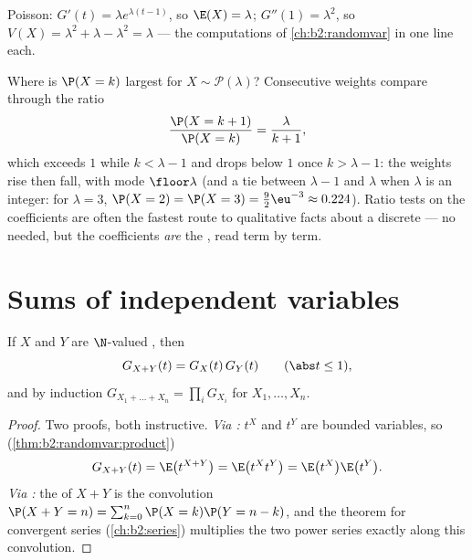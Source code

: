 \begin{example}
Poisson: $G'(t) = \lambda e^{\lambda(t-1)}$, so $\E(X) = \lambda$;
$G''(1) = \lambda^2$, so $V(X) = \lambda^2 + \lambda - \lambda^2 =
\lambda$ --- the computations of \cref{ch:b2:randomvar} in one
line each.
\end{example}

\begin{example}
\label{ex:b2:genfun:poissonmode}
Where is $\P(X = k)$ largest for $X \sim \mathcal
P(\lambda)$? Consecutive weights compare through the ratio
\[
\frac{\P(X = k+1)}{\P(X = k)} = \frac{\lambda}{k + 1} ,
\]
which exceeds $1$ while $k < \lambda - 1$ and drops below
$1$ once $k > \lambda - 1$: the weights rise then fall, with
mode $\floor\lambda$ (and a tie between $\lambda - 1$ and
$\lambda$ when $\lambda$ is an integer: for $\lambda = 3$,
$\P(X = 2) = \P(X = 3) = \frac92\eu^{-3} \approx 0.224$).
Ratio tests on the coefficients are often the fastest route
to qualitative facts about a discrete  --- no  needed, but the coefficients \emph{are} the
, read term by term.
\end{example}

\section{Sums of independent variables}

\begin{theorem}[Multiplicativity]\label{thm:b2:genfun:product}
If $X$ and $Y$ are  $\N$-valued , then
\[
G_{X + Y}(t) = G_X(t)\,G_Y(t)
\qquad (\abs t \leq 1),
\]
and by induction $G_{X_1 + \dots + X_n} = \prod_i G_{X_i}$ for
 $X_1, \dots, X_n$.
\end{theorem}

\begin{proof}
Two proofs, both instructive. \emph{Via :} $t^X$ and
$t^Y$ are  bounded variables, so
(\cref{thm:b2:randomvar:product})
\[
G_{X+Y}(t) = \E\bigl(t^{X+Y}\bigr)
= \E\bigl(t^X t^Y\bigr)
= \E\bigl(t^X\bigr)\E\bigl(t^Y\bigr) .
\]
\emph{Via :} the  of $X + Y$ is the convolution
$\P(X + Y = n) = \sum_{k=0}^n \P(X = k)\P(Y = n - k)$, and the
 theorem for  convergent series
(\cref{ch:b2:series}) multiplies the two power series exactly
along this convolution.
\end{proof}

